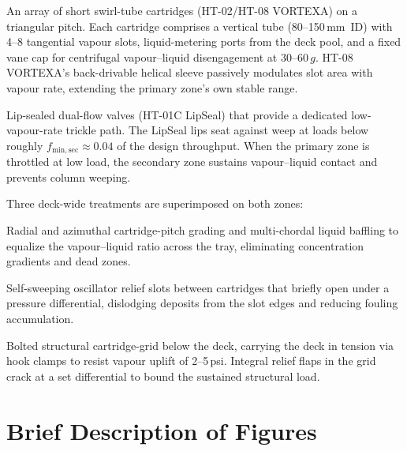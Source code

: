 \documentclass[11pt,letterpaper]{article}
\begin{document}
\begin{description}[nosep]
  \item[Primary zone (\texttildelow 70\% of $A_{\mathrm{col}}$)]
    An array of short swirl-tube cartridges (HT-02/HT-08 VORTEXA) on a
    triangular pitch.  Each cartridge comprises a vertical tube
    (80--150\,mm~ID) with 4--8 tangential vapour slots, liquid-metering ports
    from the deck pool, and a fixed vane cap for centrifugal
    vapour--liquid disengagement at 30--60\,$g$.
    HT-08 VORTEXA's back-drivable helical sleeve passively modulates slot
    area with vapour rate, extending the primary zone's own stable range.

  \item[Secondary zone (\texttildelow 15\% of $A_{\mathrm{col}}$)]
    Lip-sealed dual-flow valves (HT-01C LipSeal) that provide a dedicated
    low-vapour-rate trickle path.  The LipSeal lips seat against weep at
    loads below roughly $f_{\mathrm{min,sec}}\approx 0.04$ of the design
    throughput.  When the primary zone is throttled at low load, the secondary
    zone sustains vapour--liquid contact and prevents column weeping.
\end{description}

Three deck-wide treatments are superimposed on both zones:

\begin{description}[nosep]
  \item[GRADEX (HT-03)] Radial and azimuthal cartridge-pitch grading and
    multi-chordal liquid baffling to equalize the vapour--liquid ratio across
    the tray, eliminating concentration gradients and dead zones.
  \item[PULSAR (HT-05)] Self-sweeping oscillator relief slots between
    cartridges that briefly open under a pressure differential, dislodging
    deposits from the slot edges and reducing fouling accumulation.
  \item[AEGIS (HT-07)] Bolted structural cartridge-grid below the deck,
    carrying the deck in tension via hook clamps to resist vapour uplift of
    2--5\,psi.  Integral relief flaps in the grid crack at a set differential
    to bound the sustained structural load.
\end{description}

\section{Brief Description of Figures}
\end{document}

